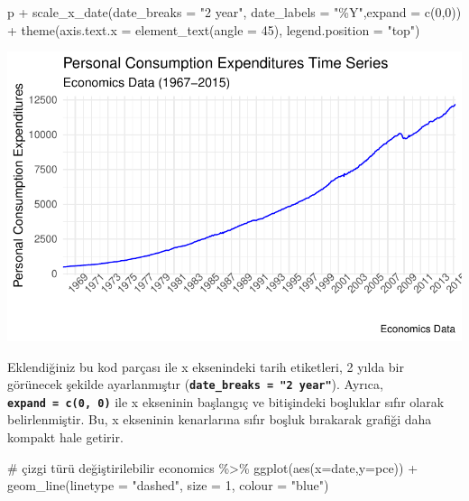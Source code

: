 \documentclass[
  letterpaper,
  DIV=11,
  numbers=noendperiod]{scrreprt}
\newenvironment{Shaded}{\begin{snugshade}}{\end{snugshade}}
\newcommand{\AttributeTok}[1]{\textcolor[rgb]{0.40,0.45,0.13}{#1}}
\newcommand{\CommentTok}[1]{\textcolor[rgb]{0.37,0.37,0.37}{#1}}
\newcommand{\DecValTok}[1]{\textcolor[rgb]{0.68,0.00,0.00}{#1}}
\newcommand{\FunctionTok}[1]{\textcolor[rgb]{0.28,0.35,0.67}{#1}}
\newcommand{\NormalTok}[1]{\textcolor[rgb]{0.00,0.23,0.31}{#1}}
\newcommand{\SpecialCharTok}[1]{\textcolor[rgb]{0.37,0.37,0.37}{#1}}
\newcommand{\StringTok}[1]{\textcolor[rgb]{0.13,0.47,0.30}{#1}}
\begin{document}
\begin{Shaded}
\begin{Highlighting}[]
\NormalTok{p }\SpecialCharTok{+} 
  \FunctionTok{scale\_x\_date}\NormalTok{(}\AttributeTok{date\_breaks =} \StringTok{"2 year"}\NormalTok{, }\AttributeTok{date\_labels =} \StringTok{"\%Y"}\NormalTok{,}\AttributeTok{expand =} \FunctionTok{c}\NormalTok{(}\DecValTok{0}\NormalTok{,}\DecValTok{0}\NormalTok{)) }\SpecialCharTok{+}
  \FunctionTok{theme}\NormalTok{(}\AttributeTok{axis.text.x =} \FunctionTok{element\_text}\NormalTok{(}\AttributeTok{angle =} \DecValTok{45}\NormalTok{), }\AttributeTok{legend.position =} \StringTok{"top"}\NormalTok{)}
\end{Highlighting}
\end{Shaded}

\includegraphics{ggplot2_files/figure-pdf/unnamed-chunk-22-1.pdf}

Eklendiğiniz bu kod parçası ile x eksenindeki tarih etiketleri, 2 yılda
bir görünecek şekilde ayarlanmıştır
(\textbf{\texttt{date\_breaks\ =\ "2\ year"}}). Ayrıca,
\textbf{\texttt{expand\ =\ c(0,\ 0)}} ile x ekseninin başlangıç ve
bitişindeki boşluklar sıfır olarak belirlenmiştir. Bu, x ekseninin
kenarlarına sıfır boşluk bırakarak grafiği daha kompakt hale getirir.

\begin{Shaded}
\begin{Highlighting}[]
\CommentTok{\# çizgi türü değiştirilebilir}
\NormalTok{economics }\SpecialCharTok{\%\textgreater{}\%} 
  \FunctionTok{ggplot}\NormalTok{(}\FunctionTok{aes}\NormalTok{(}\AttributeTok{x=}\NormalTok{date,}\AttributeTok{y=}\NormalTok{pce)) }\SpecialCharTok{+}
  \FunctionTok{geom\_line}\NormalTok{(}\AttributeTok{linetype =} \StringTok{"dashed"}\NormalTok{, }\AttributeTok{size =} \DecValTok{1}\NormalTok{, }\AttributeTok{colour =} \StringTok{"blue"}\NormalTok{)}
\end{Highlighting}
\end{Shaded}
\end{document}
